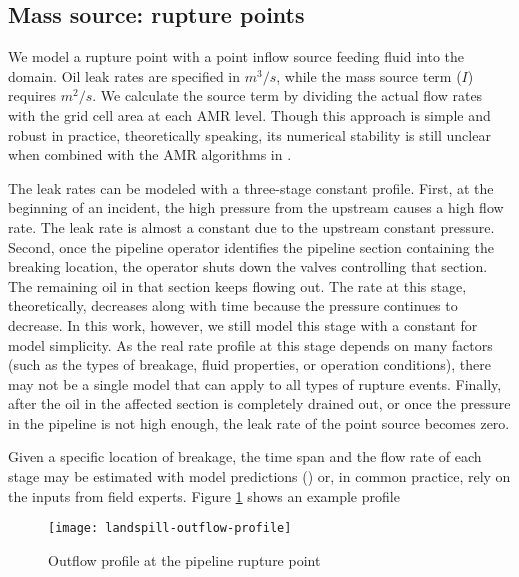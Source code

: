 
\subsection{Mass source: rupture points}

We model a rupture point with a point inflow source feeding fluid into the domain.
Oil leak rates are specified in $m^3/s$, while the mass source term ($I$) requires $m^2/s$.
We calculate the source term by dividing the actual flow rates with the grid cell area at each AMR level.
Though this approach is simple and robust in practice, theoretically speaking, its numerical stability is still unclear when combined with the AMR algorithms in \geoclaw.

The leak rates can be modeled with a three-stage constant profile.
First, at the beginning of an incident, the high pressure from the upstream causes a high flow rate.
The leak rate is almost a constant due to the upstream constant pressure.
Second, once the pipeline operator identifies the pipeline section containing the breaking location, the operator shuts down the valves controlling that section.
The remaining oil in that section keeps flowing out.
The rate at this stage, theoretically, decreases along with time because the pressure continues to decrease.
In this work, however, we still model this stage with a constant for model simplicity.
As the real rate profile at this stage depends on many factors (such as the types of breakage, fluid properties, or operation conditions), there may not be a single model that can apply to all types of rupture events.
Finally, after the oil in the affected section is completely drained out, or once the pressure in the pipeline is not high enough, the leak rate of the point source becomes zero.

Given a specific location of breakage, the time span and the flow rate of each stage may be estimated with model predictions (\cite{abhulimen_liquid_2004}) or, in common practice, rely on the inputs from field experts.
Figure \ref{fig:outflow-profile} shows an example profile 

\begin{figure}
    \centering
    \texttt{[image: landspill-outflow-profile]}
    \caption{Outflow profile at the pipeline rupture point}\label{fig:outflow-profile}
\end{figure}
